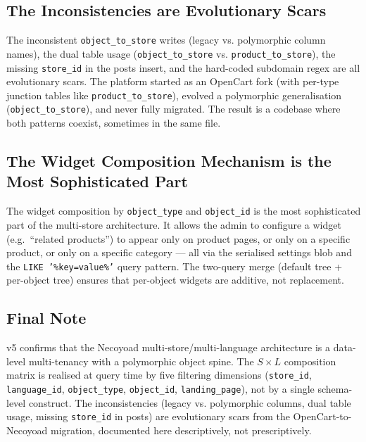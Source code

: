\documentclass[11pt,a4paper]{article}
\begin{document}
\subsection{The Inconsistencies are Evolutionary Scars}

The inconsistent \texttt{object\_to\_store} writes (legacy vs.
polymorphic column names), the dual table usage
(\texttt{object\_to\_store} vs. \texttt{product\_to\_store}), the
missing \texttt{store\_id} in the posts insert, and the hard-coded
subdomain regex are all evolutionary scars. The platform started as
an OpenCart fork (with per-type junction tables like
\texttt{product\_to\_store}), evolved a polymorphic generalisation
(\texttt{object\_to\_store}), and never fully migrated. The result
is a codebase where both patterns coexist, sometimes in the same
file.

\subsection{The Widget Composition Mechanism is the Most Sophisticated Part}

The widget composition by \texttt{object\_type} and
\texttt{object\_id} is the most sophisticated part of the multi-store
architecture. It allows the admin to configure a widget (e.g.\
``related products'') to appear only on product pages, or only on a
specific product, or only on a specific category --- all via the
serialised settings blob and the \texttt{LIKE '\%key=value\%'}
query pattern. The two-query merge (default tree + per-object tree)
ensures that per-object widgets are additive, not replacement.

\subsection{Final Note}

v5 confirms that the Necoyoad multi-store/multi-language architecture
is a data-level multi-tenancy with a polymorphic object spine. The
$S \times L$ composition matrix is realised at query time by five
filtering dimensions (\texttt{store\_id}, \texttt{language\_id},
\texttt{object\_type}, \texttt{object\_id}, \texttt{landing\_page}),
not by a single schema-level construct. The inconsistencies
(legacy vs. polymorphic columns, dual table usage, missing
\texttt{store\_id} in posts) are evolutionary scars from the
OpenCart-to-Necoyoad migration, documented here descriptively, not
prescriptively.

\appendix
\end{document}
